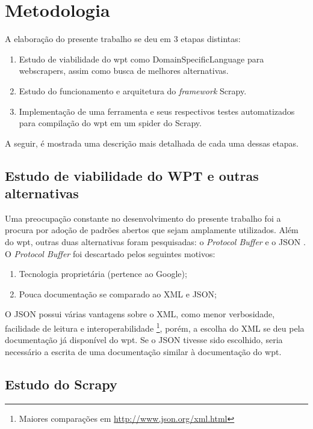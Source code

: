 \chapter{Metodologia}
\thispagestyle{fancy}

A elaboração do presente trabalho se deu em 3 etapas distintas:

\begin{enumerate}
	\item Estudo de viabilidade do \gls{wpt} como \gls{DomainSpecificLanguage} para \glspl{webscraper}, assim como busca de melhores alternativas.
	\item Estudo do funcionamento e arquitetura do \textit{framework} Scrapy.
	\item Implementação de uma ferramenta e seus respectivos testes automatizados para compilação do \gls{wpt} em um \gls{spider} do Scrapy.
\end{enumerate}

A seguir, é mostrada uma descrição mais detalhada de cada uma dessas etapas.

\section{Estudo de viabilidade do WPT e outras alternativas}

Uma preocupação constante no desenvolvimento do presente trabalho foi a procura por adoção de padrões abertos que sejam amplamente utilizados. Além do \gls{wpt}, outras duas alternativas foram pesquisadas: o \textit{Protocol Buffer} \cite{protobuf} e o JSON \cite{JSON}. O \emph{Protocol Buffer} foi descartado pelos seguintes motivos:

\begin{enumerate}
	\item Tecnologia proprietária (pertence ao Google);
	\item Pouca documentação se comparado ao XML e JSON;
\end{enumerate}

O JSON possui várias vantagens sobre o XML, como menor verbosidade, facilidade de leitura e interoperabilidade \footnote{Maiores comparações em \url{http://www.json.org/xml.html}}, porém, a escolha do XML se deu pela documentação já disponível do \gls{wpt}. Se o JSON tivesse sido escolhido, seria necessário a escrita de uma documentação similar à documentação do \gls{wpt}.

\section{Estudo do Scrapy}

